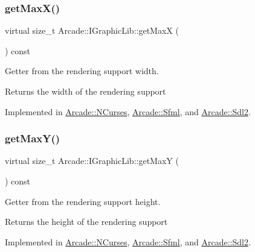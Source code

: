 \subsubsection{\texorpdfstring{get\+Max\+X()}{getMaxX()}}
{\footnotesize\ttfamily virtual size\+\_\+t Arcade\+::\+I\+Graphic\+Lib\+::get\+MaxX (\begin{DoxyParamCaption}{ }\end{DoxyParamCaption}) const\hspace{0.3cm}{\ttfamily [pure virtual]}}



Getter from the rendering support width. 

\begin{DoxyReturn}{Returns}
the width of the rendering support 
\end{DoxyReturn}


Implemented in \hyperlink{class_arcade_1_1_n_curses_a9f561bd405af76689763819794382ef1}{Arcade\+::\+N\+Curses}, \hyperlink{class_arcade_1_1_sfml_a220fc84bb5728f79e36024fded0103ab}{Arcade\+::\+Sfml}, and \hyperlink{class_arcade_1_1_sdl2_a9e9e70db8a77c2dee10e2227c70415e3}{Arcade\+::\+Sdl2}.

\mbox{\label{class_arcade_1_1_i_graphic_lib_ae8701e702b51189c84b1900dd624912e}} 
\subsubsection{\texorpdfstring{get\+Max\+Y()}{getMaxY()}}
{\footnotesize\ttfamily virtual size\+\_\+t Arcade\+::\+I\+Graphic\+Lib\+::get\+MaxY (\begin{DoxyParamCaption}{ }\end{DoxyParamCaption}) const\hspace{0.3cm}{\ttfamily [pure virtual]}}



Getter from the rendering support height. 

\begin{DoxyReturn}{Returns}
the height of the rendering support 
\end{DoxyReturn}


Implemented in \hyperlink{class_arcade_1_1_n_curses_a00c879117a1de6752acd376bfd59e94d}{Arcade\+::\+N\+Curses}, \hyperlink{class_arcade_1_1_sfml_a90cb12cc852a0198074f55be843d6f99}{Arcade\+::\+Sfml}, and \hyperlink{class_arcade_1_1_sdl2_a958b3611cb0f7db90eeca5c9c4eaed59}{Arcade\+::\+Sdl2}.

